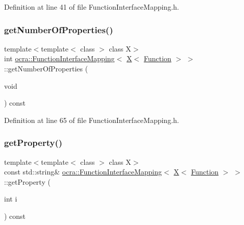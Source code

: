 Definition at line 41 of file Function\+Interface\+Mapping.\+h.

\hypertarget{structocra_1_1FunctionInterfaceMapping_3_01X_3_01Function_01_4_01_4_a2b76f1e86519c85c2e6f8147356f2139}{}\label{structocra_1_1FunctionInterfaceMapping_3_01X_3_01Function_01_4_01_4_a2b76f1e86519c85c2e6f8147356f2139} 
\subsubsection{\texorpdfstring{get\+Number\+Of\+Properties()}{getNumberOfProperties()}}
{\footnotesize\ttfamily template$<$template$<$ class $>$ class X$>$ \\
int \hyperlink{structocra_1_1FunctionInterfaceMapping}{ocra\+::\+Function\+Interface\+Mapping}$<$ \hyperlink{namespaceocra_a436781c7059a0f76027df1c652126260a53f3cfeeb322946db40cd86dfebfb237}{X}$<$ \hyperlink{classocra_1_1Function}{Function} $>$ $>$\+::get\+Number\+Of\+Properties (\begin{DoxyParamCaption}\item[{void}]{ }\end{DoxyParamCaption}) const\hspace{0.3cm}{\ttfamily [inline]}}



Definition at line 65 of file Function\+Interface\+Mapping.\+h.

\hypertarget{structocra_1_1FunctionInterfaceMapping_3_01X_3_01Function_01_4_01_4_a88001c322d25b358b7a88662268ccd12}{}\label{structocra_1_1FunctionInterfaceMapping_3_01X_3_01Function_01_4_01_4_a88001c322d25b358b7a88662268ccd12} 
\subsubsection{\texorpdfstring{get\+Property()}{getProperty()}}
{\footnotesize\ttfamily template$<$template$<$ class $>$ class X$>$ \\
const std\+::string\& \hyperlink{structocra_1_1FunctionInterfaceMapping}{ocra\+::\+Function\+Interface\+Mapping}$<$ \hyperlink{namespaceocra_a436781c7059a0f76027df1c652126260a53f3cfeeb322946db40cd86dfebfb237}{X}$<$ \hyperlink{classocra_1_1Function}{Function} $>$ $>$\+::get\+Property (\begin{DoxyParamCaption}\item[{int}]{i }\end{DoxyParamCaption}) const\hspace{0.3cm}{\ttfamily [inline]}}



